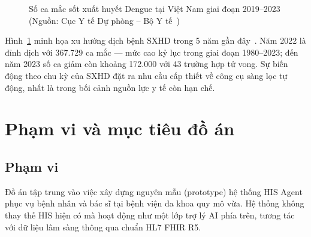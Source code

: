 \documentclass[a4paper,13pt,3p,oneside]{report}
\theoremstyle{definition}
\theoremstyle{remark}
\theoremstyle{definition}
\begin{document}
\begin{figure}[H]
\centering
{}
\caption{Số ca mắc sốt xuất huyết Dengue tại Việt Nam giai đoạn 2019--2023 (Nguồn: Cục Y tế Dự phòng -- Bộ Y tế~\cite{dengue_stats})}
\label{fig:dengue-stats}
\end{figure}

Hình~\ref{fig:dengue-stats} minh họa xu hướng dịch bệnh SXHD trong 5 năm gần đây~\cite{dengue_stats}. Năm 2022 là đỉnh dịch với 367.729 ca mắc --- mức cao kỷ lục trong giai đoạn 1980--2023; đến năm 2023 số ca giảm còn khoảng 172.000 với 43 trường hợp tử vong. Sự biến động theo chu kỳ của SXHD đặt ra nhu cầu cấp thiết về công cụ sàng lọc tự động, nhất là trong bối cảnh nguồn lực y tế còn hạn chế.

\section{Phạm vi và mục tiêu đồ án}

\subsection{Phạm vi}

Đồ án tập trung vào việc xây dựng nguyên mẫu (prototype) hệ thống HIS Agent phục vụ bệnh nhân và bác sĩ tại bệnh viện đa khoa quy mô vừa. Hệ thống không thay thế HIS hiện có mà hoạt động như một lớp trợ lý AI phía trên, tương tác với dữ liệu lâm sàng thông qua chuẩn HL7 FHIR R5.
\end{document}
